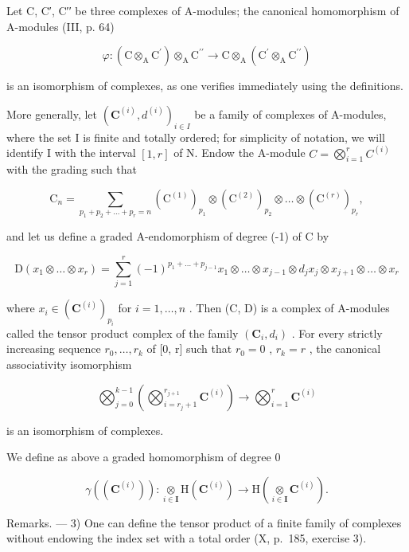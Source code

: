 Let C, C′, C′′ be three complexes of A-modules; the canonical homomorphism of A-modules (III, p. 64)

\[
\varphi : \left(\mathrm{C} \otimes_ {\mathrm{A}} \mathrm{C} ^ {\prime}\right) \otimes_ {\mathrm{A}} \mathrm{C} ^ {\prime \prime} \rightarrow \mathrm{C} \otimes_ {\mathrm{A}} \left(\mathrm{C} ^ {\prime} \otimes_ {\mathrm{A}} \mathrm{C} ^ {\prime \prime}\right)
\]

is an isomorphism of complexes, as one verifies immediately using the definitions.

More generally, let \((\mathbf{C}^{(i)}, d^{(i)})_{i \in I}\) be a family of complexes of A-modules, where the set I is finite and totally ordered; for simplicity of notation, we will identify I with the interval \([1, r]\) of N. Endow the A-module \(C = \bigotimes_{i=1}^{r} C^{(i)}\) with the grading such that

\[
\mathrm{C} _ {n} = \sum_ {p _ {1} + p _ {2} + \dots + p _ {r} = n} (\mathrm{C} ^ {(1)}) _ {p _ {1}} \otimes (\mathrm{C} ^ {(2)}) _ {p _ {2}} \otimes \dots \otimes (\mathrm{C} ^ {(r)}) _ {p _ {r}},
\]

and let us define a graded A-endomorphism of degree (-1) of C by

\[
\mathrm{D} \left(x _ {1} \otimes \dots \otimes x _ {r}\right) = \sum_ {j = 1} ^ {r} (- 1) ^ {p _ {1} + \dots + p _ {j - 1}} x _ {1} \otimes \dots \otimes x _ {j - 1} \otimes d _ {j} x _ {j} \otimes x _ {j + 1} \otimes \dots \otimes x _ {r}
\]

where \(x_{i}\in (\mathbf{C}^{(i)})_{p_{i}}\) for \(i = 1,\dots,n\) . Then (C, D) is a complex of A-modules called the tensor product complex of the family \((\mathbf{C}_{i}, d_{i})\) . For every strictly increasing sequence \(r_{0}, \ldots, r_{k}\) of [0, r] such that \(r_{0} = 0\) , \(r_{k} = r\) , the canonical associativity isomorphism

\[
\bigotimes_ {j = 0} ^ {k - 1} \left(\bigotimes_ {i = r _ {j} + 1} ^ {r _ {j + 1}} \mathbf {C} ^ {(i)}\right)\rightarrow \bigotimes_ {i = 1} ^ {r} \mathbf {C} ^ {(i)}
\]

is an isomorphism of complexes.

We define as above a graded homomorphism of degree 0

\[
\gamma ((\mathbf {C} ^ {(i)})): \underset {i \in \mathbf {I}} {\otimes} \mathrm{H} (\mathbf {C} ^ {(i)}) \to \mathrm{H} \left(\underset {i \in \mathbf {I}} {\otimes} \mathbf {C} ^ {(i)}\right) .
\]

Remarks. --- 3) One can define the tensor product of a finite family of complexes without endowing the index set with a total order (X, p.~185, exercise 3).

